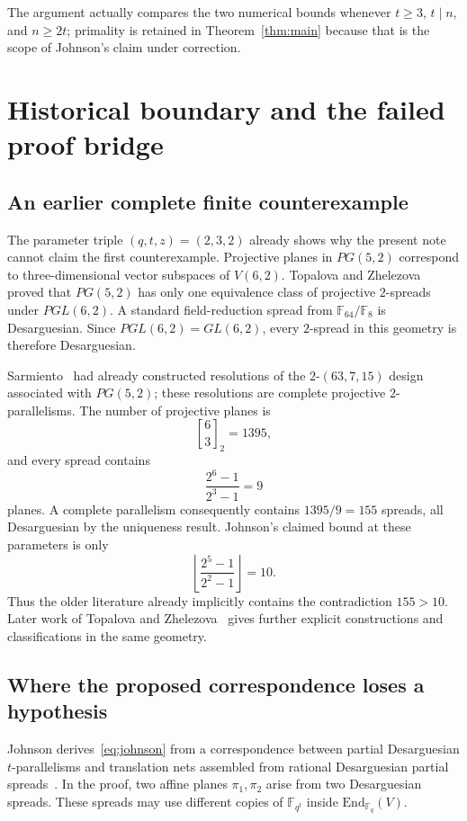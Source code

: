 \documentclass[11pt]{article}
\newcommand{\F}{\mathbb F}
\begin{document}
The argument actually compares the two numerical bounds whenever $t\geq3$,
$t\mid n$, and $n\geq2t$; primality is retained in
Theorem~\ref{thm:main} because that is the scope of Johnson's claim under
correction.

\section{Historical boundary and the failed proof bridge}
\label{sec:history}

\subsection{An earlier complete finite counterexample}

The parameter triple $(q,t,z)=(2,3,2)$ already shows why the present note
cannot claim the first counterexample. Projective planes in $PG(5,2)$
correspond to three-dimensional vector subspaces of $V(6,2)$. Topalova and
Zhelezova~\cite{Topalova2008} proved that $PG(5,2)$ has only one equivalence
class of projective $2$-spreads under $PGL(6,2)$. A standard field-reduction
spread from $\F_{64}/\F_8$ is Desarguesian. Since
$PGL(6,2)=GL(6,2)$, every $2$-spread in this geometry is therefore
Desarguesian.

Sarmiento~\cite{Sarmiento} had already constructed resolutions of the
$2$-$(63,7,15)$ design associated with $PG(5,2)$; these resolutions are
complete projective $2$-parallelisms. The number of projective planes is
\[
\genfrac{[}{]}{0pt}{}{6}{3}_{2}=1395,
\]
and every spread contains
\[
\frac{2^6-1}{2^3-1}=9
\]
planes. A complete parallelism consequently contains $1395/9=155$ spreads,
all Desarguesian by the uniqueness result. Johnson's claimed bound at these
parameters is only
\[
\left\lfloor\frac{2^5-1}{2^2-1}\right\rfloor=10.
\]
Thus the older literature already implicitly contains the contradiction
$155>10$. Later work of Topalova and Zhelezova~\cite{Topalova2010} gives
further explicit constructions and classifications in the same geometry.

\subsection{Where the proposed correspondence loses a hypothesis}

Johnson derives~\eqref{eq:johnson} from a correspondence between partial
Desarguesian $t$-parallelisms and translation nets assembled from rational
Desarguesian partial spreads~\cite[Theorem~3]{JohnsonPaper}. In the proof, two
affine planes $\pi_1,\pi_2$ arise from two Desarguesian spreads. These spreads
may use different copies of $\F_{q^t}$ inside
$\mathrm{End}_{\F_q}(V)$.
\end{document}
